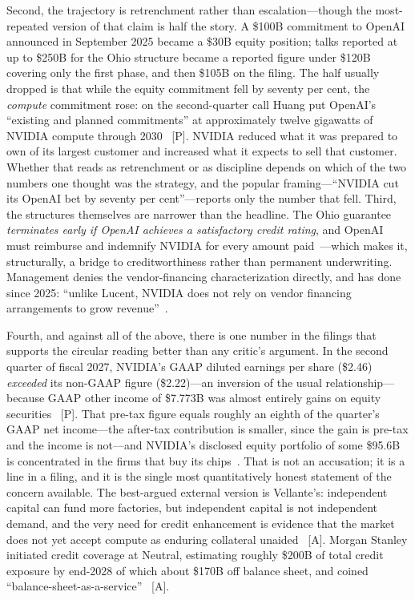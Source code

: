 Second, the trajectory is retrenchment rather than escalation---though the most-repeated version of that claim is half the story. A \$100B commitment to OpenAI announced in September 2025 became a \$30B equity position; talks reported at up to \$250B for the Ohio structure became a reported figure under \$120B covering only the first phase, and then \$105B on the filing. The half usually dropped is that while the equity commitment fell by seventy per cent, the \emph{compute} commitment rose: on the second-quarter call Huang put OpenAI's ``existing and planned commitments'' at approximately twelve gigawatts of NVIDIA compute through 2030~\cite{nvda-huang-q2} [P]. NVIDIA reduced what it was prepared to own of its largest customer and increased what it expects to sell that customer. Whether that reads as retrenchment or as discipline depends on which of the two numbers one thought was the strategy, and the popular framing---``NVIDIA cut its OpenAI bet by seventy per cent''---reports only the number that fell. Third, the structures themselves are narrower than the headline. The Ohio guarantee \emph{terminates early if OpenAI achieves a satisfactory credit rating}, and OpenAI must reimburse and indemnify NVIDIA for every amount paid~\cite{nvda-ohio}---which makes it, structurally, a bridge to creditworthiness rather than permanent underwriting. Management denies the vendor-financing characterization directly, and has done since 2025: ``unlike Lucent, NVIDIA does not rely on vendor financing arrangements to grow revenue''~\cite{nvda-critique}.

Fourth, and against all of the above, there is one number in the filings that supports the circular reading better than any critic's argument. In the second quarter of fiscal 2027, NVIDIA's GAAP diluted earnings per share (\$2.46) \emph{exceeded} its non-GAAP figure (\$2.22)---an inversion of the usual relationship---because GAAP other income of \$7.773B was almost entirely gains on equity securities~\cite{nvda-q2fy27} [P]. That pre-tax figure equals roughly an eighth of the quarter's GAAP net income---the after-tax contribution is smaller, since the gain is pre-tax and the income is not---and NVIDIA's disclosed equity portfolio of some \$95.6B is concentrated in the firms that buy its chips~\cite{nvda-exposure}. That is not an accusation; it is a line in a filing, and it is the single most quantitatively honest statement of the concern available. The best-argued external version is Vellante's: independent capital can fund more factories, but independent capital is not independent demand, and the very need for credit enhancement is evidence that the market does not yet accept compute as enduring collateral unaided~\cite{nvda-critique} [A]. Morgan Stanley initiated credit coverage at Neutral, estimating roughly \$200B of total credit exposure by end-2028 of which about \$170B off balance sheet, and coined ``balance-sheet-as-a-service''~\cite{nvda-morgan-stanley} [A].

